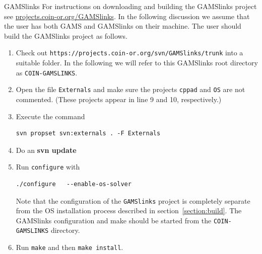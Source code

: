 \documentclass[11pt]{article}
\renewcommand{\_}{{\char"5F}}
\renewcommand{\{}{{\char"7B}}
\renewcommand{\}}{{\char"7D}}
\renewcommand{\^}{{\char"0D}}
\renewcommand{\'}{{\char"0D}}
\newcommand{\UrlGamslinks}{https://projects.coin-or.org/svn/GAMSlinks/trunk}
\begin{document}
\begin{enumerate}[Step 1:]

GAMSlinks
For instructions on downloading and building  the GAMSlinks project see \url{projects.coin-or.org/GAMSlinks}.
In the following discussion we assume that the user has both GAMS and GAMSlinks on their machine.
The user should build the GAMSlinks project as follows.

\begin{enumerate}[1.]

\item  Check out {\tt\UrlGamslinks} into a suitable folder. In the following we
will refer to this GAMSlinks root directory as {\tt COIN-GAMSLINKS}.

\item Open the file {\tt Externals} and make sure the projects {\tt cppad} and {\tt OS} are not commented.
(These projects appear in line 9 and 10, respectively.)

\item Execute the command

\begin{verbatim}
svn propset svn:externals . -F Externals
\end{verbatim}


\item  Do an {\bf svn update}

\item Run {\tt configure} with

\begin{verbatim}
./configure   --enable-os-solver
\end{verbatim}

Note that the configuration of the {\tt GAMSlinks} project is completely separate from the OS installation process
described in section~\ref{section:build}. The GAMSlinks configuration and make should be started from the
{\tt COIN-GAMSLINKS} directory.

\item Run {\tt make}  and then {\tt make install}.


\end{enumerate}


\end{enumerate}
\end{document}
